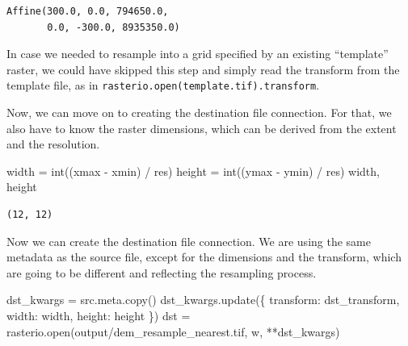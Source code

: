 \documentclass[
  letterpaper,
]{krantz}
\newenvironment{Shaded}{\begin{snugshade}}{\end{snugshade}}
\newcommand{\BuiltInTok}[1]{\textcolor[rgb]{0.00,0.23,0.31}{#1}}
\newcommand{\NormalTok}[1]{\textcolor[rgb]{0.00,0.23,0.31}{#1}}
\newcommand{\OperatorTok}[1]{\textcolor[rgb]{0.37,0.37,0.37}{#1}}
\newcommand{\StringTok}[1]{\textcolor[rgb]{0.13,0.47,0.30}{#1}}
\begin{document}
\begin{verbatim}
Affine(300.0, 0.0, 794650.0,
       0.0, -300.0, 8935350.0)
\end{verbatim}

In case we needed to resample into a grid specified by an existing
``template'' raster, we could have skipped this step and simply read the
transform from the template file, as in
\texttt{rasterio.open(\textquotesingle{}template.tif\textquotesingle{}).transform}.

Now, we can move on to creating the destination file connection. For
that, we also have to know the raster dimensions, which can be derived
from the extent and the resolution.

\begin{Shaded}
\begin{Highlighting}[]
\NormalTok{width }\OperatorTok{=} \BuiltInTok{int}\NormalTok{((xmax }\OperatorTok{{-}}\NormalTok{ xmin) }\OperatorTok{/}\NormalTok{ res)}
\NormalTok{height }\OperatorTok{=} \BuiltInTok{int}\NormalTok{((ymax }\OperatorTok{{-}}\NormalTok{ ymin) }\OperatorTok{/}\NormalTok{ res)}
\NormalTok{width, height}
\end{Highlighting}
\end{Shaded}

\begin{verbatim}
(12, 12)
\end{verbatim}

Now we can create the destination file connection. We are using the same
metadata as the source file, except for the dimensions and the
transform, which are going to be different and reflecting the resampling
process.

\begin{Shaded}
\begin{Highlighting}[]
\NormalTok{dst\_kwargs }\OperatorTok{=}\NormalTok{ src.meta.copy()}
\NormalTok{dst\_kwargs.update(\{}
    \StringTok{\textquotesingle{}transform\textquotesingle{}}\NormalTok{: dst\_transform,}
    \StringTok{\textquotesingle{}width\textquotesingle{}}\NormalTok{: width,}
    \StringTok{\textquotesingle{}height\textquotesingle{}}\NormalTok{: height}
\NormalTok{\})}
\NormalTok{dst }\OperatorTok{=}\NormalTok{ rasterio.}\BuiltInTok{open}\NormalTok{(}\StringTok{\textquotesingle{}output/dem\_resample\_nearest.tif\textquotesingle{}}\NormalTok{, }\StringTok{\textquotesingle{}w\textquotesingle{}}\NormalTok{, }\OperatorTok{**}\NormalTok{dst\_kwargs)}
\end{Highlighting}
\end{Shaded}
\end{document}
